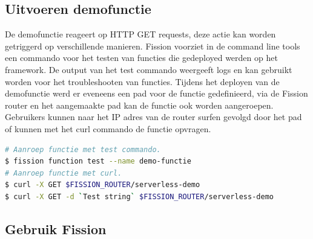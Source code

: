 \subsection{Uitvoeren demofunctie}
De demofunctie reageert op HTTP GET requests, deze actie kan worden getriggerd op verschillende manieren. Fission voorziet in de command line tools een commando voor het testen van functies die gedeployed werden op het framework. De output van het test commando weergeeft logs en kan gebruikt worden voor het troubleshooten van functies. Tijdens het deployen van de demofunctie werd er eveneens een pad voor de functie gedefinieerd, via de Fission router en het aangemaakte pad kan de functie ook worden aangeroepen. Gebruikers kunnen naar het IP adres van de router surfen gevolgd door het pad of kunnen met het curl commando de functie opvragen.

\begin{lstlisting}[language=bash]
# Aanroep functie met test commando.
$ fission function test --name demo-functie
# Aanroep functie met curl.
$ curl -X GET $FISSION_ROUTER/serverless-demo
$ curl -X GET -d `Test string` $FISSION_ROUTER/serverless-demo
\end{lstlisting}

\subsection{Gebruik Fission}
